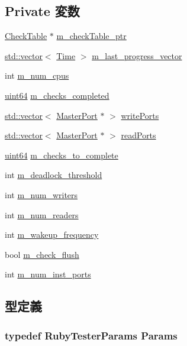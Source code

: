 \subsection*{Private 変数}
\begin{DoxyCompactItemize}
\item 
\hyperlink{classCheckTable}{CheckTable} $\ast$ \hyperlink{classRubyTester_aea4972439fb74004b80eb744d5adaf03}{m\_\-checkTable\_\-ptr}
\item 
\hyperlink{classstd_1_1vector}{std::vector}$<$ \hyperlink{classTime}{Time} $>$ \hyperlink{classRubyTester_a64bbb232772e2688790c89678aafa89e}{m\_\-last\_\-progress\_\-vector}
\item 
int \hyperlink{classRubyTester_a696a7ada843596770ab04a749b5ffd67}{m\_\-num\_\-cpus}
\item 
\hyperlink{TypeDefines_8hh_a29940ae63ec06c9998bba873e25407ad}{uint64} \hyperlink{classRubyTester_a2cdd157694ca34abf0f26e715ed66907}{m\_\-checks\_\-completed}
\item 
\hyperlink{classstd_1_1vector}{std::vector}$<$ \hyperlink{classMasterPort}{MasterPort} $\ast$ $>$ \hyperlink{classRubyTester_ac70f96ce30f653210523935c455b76f4}{writePorts}
\item 
\hyperlink{classstd_1_1vector}{std::vector}$<$ \hyperlink{classMasterPort}{MasterPort} $\ast$ $>$ \hyperlink{classRubyTester_a932d2fee1f64944ee00898b8d4a17112}{readPorts}
\item 
\hyperlink{TypeDefines_8hh_a29940ae63ec06c9998bba873e25407ad}{uint64} \hyperlink{classRubyTester_a54fb656689e153912405d489825d2a90}{m\_\-checks\_\-to\_\-complete}
\item 
int \hyperlink{classRubyTester_ad5abdeaaf93c52d671abd33a762b4876}{m\_\-deadlock\_\-threshold}
\item 
int \hyperlink{classRubyTester_aedeaccd67403213e1e43d99ff1c70f44}{m\_\-num\_\-writers}
\item 
int \hyperlink{classRubyTester_a7d224a04c5f0d1049dd6c6ab070884cb}{m\_\-num\_\-readers}
\item 
int \hyperlink{classRubyTester_a40394bd6ef55e1c6f0d6d614b2039886}{m\_\-wakeup\_\-frequency}
\item 
bool \hyperlink{classRubyTester_a6c0bbb19bd909943c050b498ec1350ba}{m\_\-check\_\-flush}
\item 
int \hyperlink{classRubyTester_acf32e95ded135b636d78d731d850fc0f}{m\_\-num\_\-inst\_\-ports}
\end{DoxyCompactItemize}


\subsection{型定義}
\hypertarget{classRubyTester_a6785f65e1745860fc5b53cbf4aefc2f7}{
\subsubsection[{Params}]{\setlength{\rightskip}{0pt plus 5cm}typedef RubyTesterParams {\bf Params}}}
\label{classRubyTester_a6785f65e1745860fc5b53cbf4aefc2f7}


